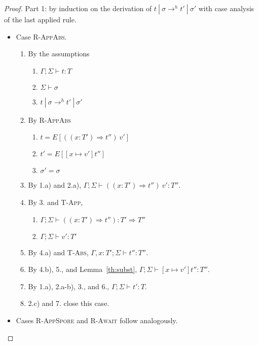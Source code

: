 \begin{proof}

Part 1: by induction on the derivation of $t~|~\sigma \rightarrow^h t'~|~\sigma'$ with case analysis of the last applied rule.

\begin{itemize}
\item Case \textsc{R-AppAbs}.
\begin{enumerate}
\item By the assumptions
  \begin{enumerate}[label=(\alph*)]
  \item $\Gamma ; \Sigma \vdash t : T$
  \item $\Sigma \vdash \sigma$
  \item $t~|~\sigma \rightarrow^h t'~|~\sigma'$
  \end{enumerate}
\item By \textsc{R-AppAbs}
  \begin{enumerate}[label=(\alph*)]
  \item $t = E[((x : T') \Rightarrow t'')~v']$
  \item $t' = E[[x \mapsto v']t'']$
  \item $\sigma' = \sigma$
  \end{enumerate}
\item By 1.a) and 2.a), $\Gamma ; \Sigma \vdash ((x : T') \Rightarrow t'')~v' : T''$.
\item By 3. and \textsc{T-App},
  \begin{enumerate}[label=(\alph*)]
  \item $\Gamma ; \Sigma \vdash ((x : T') \Rightarrow t'') : T' \Rightarrow T''$
  \item $\Gamma ; \Sigma \vdash v' : T'$
  \end{enumerate}
\item By 4.a) and \textsc{T-Abs}, $\Gamma , x : T' ; \Sigma \vdash t'' : T''$.
\item By 4.b), 5., and Lemma~\ref{th:subst}, $\Gamma ; \Sigma \vdash [x \mapsto v']t'' : T''$.
\item By 1.a), 2.a-b), 3., and 6., $\Gamma ; \Sigma \vdash t' : T$.
\item 2.c) and 7. close this case.
\end{enumerate}

\item Cases \textsc{R-AppSpore} and \textsc{R-Await} follow analogously.


\end{itemize}
\end{proof}
